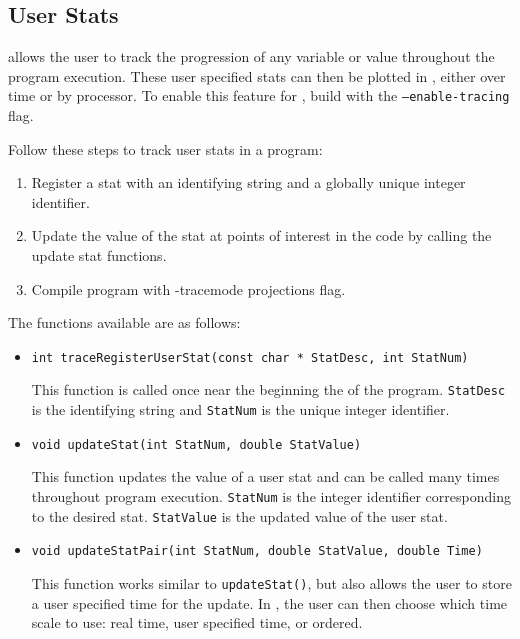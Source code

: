 \subsection{User Stats}
\label{sec::user stats}

\charmpp{} allows the user to track the progression of any variable or value throughout the program execution.
These user specified stats can then be plotted in \projections{}, either over time or by processor.
To enable this feature for \charmpp{}, build \charmpp{} with the {\tt --enable-tracing} flag.

Follow these steps to track user stats in a \charmpp{} program:

\begin{enumerate}
\item
Register a stat with an identifying string and a globally unique integer identifier.

\item
Update the value of the stat at points of interest in the code by calling the update stat functions.

\item
Compile program with -tracemode projections flag.
\end{enumerate}

The functions available are as follows:

\begin{itemize}
\item
{\tt int traceRegisterUserStat(const char * StatDesc, int StatNum) }

This function is called once near the beginning the of the \charmpp{} program. {\tt StatDesc} is the identifying
string and {\tt StatNum} is the unique integer identifier.

\item
{\tt void updateStat(int StatNum, double StatValue)}

This function updates the value of a user stat and can be called many times throughout program execution.
{\tt StatNum} is the integer identifier corresponding to the desired stat. {\tt StatValue} is the updated value of the user stat.

\item
{\tt void updateStatPair(int StatNum, double StatValue, double Time)}

This function works similar to {\tt updateStat()}, but also allows the user to store a user specified time for the update. In 
\projections{}, the user can then choose which time scale to use: real time, user specified time, or ordered.

\end{itemize}

